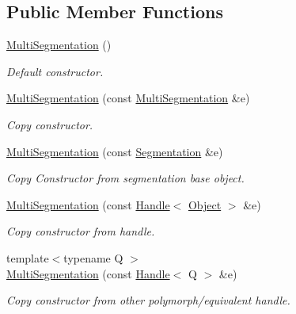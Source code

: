 \subsection*{Public Member Functions}
\begin{DoxyCompactItemize}
\item 
\hyperlink{class_d_d4hep_1_1_geometry_1_1_multi_segmentation_a97c6e80bf6021fd636b9daa02a51e500}{MultiSegmentation} ()
\begin{DoxyCompactList}\small\item\em Default constructor. \item\end{DoxyCompactList}\item 
\hyperlink{class_d_d4hep_1_1_geometry_1_1_multi_segmentation_afe1ecdac22ae72be46f40371512dbdcd}{MultiSegmentation} (const \hyperlink{class_d_d4hep_1_1_geometry_1_1_multi_segmentation}{MultiSegmentation} \&e)
\begin{DoxyCompactList}\small\item\em Copy constructor. \item\end{DoxyCompactList}\item 
\hyperlink{class_d_d4hep_1_1_geometry_1_1_multi_segmentation_ae419654849efd81b60901d521924244c}{MultiSegmentation} (const \hyperlink{class_d_d4hep_1_1_geometry_1_1_segmentation}{Segmentation} \&e)
\begin{DoxyCompactList}\small\item\em Copy Constructor from segmentation base object. \item\end{DoxyCompactList}\item 
\hyperlink{class_d_d4hep_1_1_geometry_1_1_multi_segmentation_a7ce624da1104ebe6d35c0cfa2d75aaad}{MultiSegmentation} (const \hyperlink{class_d_d4hep_1_1_handle}{Handle}$<$ \hyperlink{class_t}{Object} $>$ \&e)
\begin{DoxyCompactList}\small\item\em Copy constructor from handle. \item\end{DoxyCompactList}\item 
{\footnotesize template$<$typename Q $>$ }\\\hyperlink{class_d_d4hep_1_1_geometry_1_1_multi_segmentation_a2f828b0c929bc0e37db579c1dd73b86d}{MultiSegmentation} (const \hyperlink{class_d_d4hep_1_1_handle}{Handle}$<$ Q $>$ \&e)
\begin{DoxyCompactList}\small\item\em Copy constructor from other polymorph/equivalent handle. \item\end{DoxyCompactList}\item 

\end{DoxyCompactItemize}
